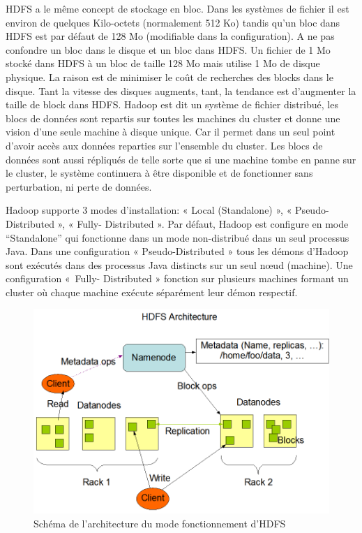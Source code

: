 \documentclass[12pt,french]{book}
\begin{document}
HDFS a le même concept de stockage en bloc.
Dans les systèmes de fichier il est environ de quelques Kilo-octets (normalement 512 Ko) tandis qu’un bloc dans HDFS est par défaut de 128 Mo (modifiable dans la configuration).
A ne pas confondre un bloc dans le disque et un bloc dans HDFS.
Un fichier de 1 Mo stocké dans HDFS à un bloc de taille 128 Mo mais utilise 1 Mo de disque physique.
La raison est de minimiser le coût de recherches des blocks dans le disque.
Tant la vitesse des disques augments, tant, la tendance est d’augmenter la taille de block dans HDFS. 
Hadoop est dit un système de fichier distribué, les blocs de données sont repartis sur toutes les machines du cluster et donne une vision d’une seule machine à disque unique.
Car il permet dans un seul point d’avoir accès aux données reparties sur l’ensemble du cluster.
Les blocs de données sont aussi répliqués de telle sorte que si une machine tombe en panne sur le cluster, le système continuera à être disponible et de fonctionner sans perturbation, ni perte de données.

Hadoop supporte 3 modes d’installation: « Local (Standalone) », « Pseudo-Distributed », « Fully- Distributed ». Par défaut, Hadoop est configure en mode “Standalone” qui fonctionne dans un mode non-distribué dans un seul processus Java.  Dans une configuration « Pseudo-Distributed » tous les démons d’Hadoop sont exécutés dans des processus Java distincts sur un seul nœud (machine). Une configuration « Fully- Distributed » fonction sur plusieurs machines formant un cluster où chaque machine exécute séparément leur démon respectif.

\newpage
\begin{figure}[t]
	\centering
	\includegraphics[width=\linewidth]{hdfsArch}
	\caption[Schéma de l'architecture du mode fonctionnement d'HDFS ]{Schéma de l'architecture du mode fonctionnement d'HDFS \footnotemark}
\end{figure}
\end{document}
